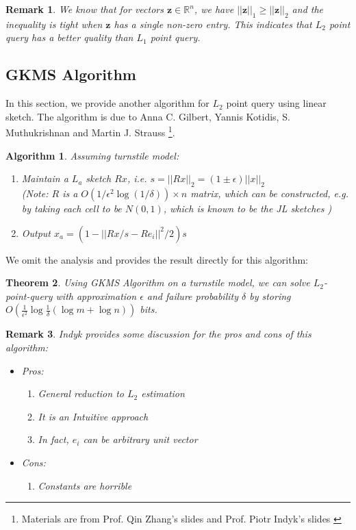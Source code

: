 \documentclass[11pt]{article}
\theoremstyle{plain}
\newtheorem{theorem}{Theorem}[section]
\newtheorem{algorithm}{Algorithm}[section]
\newtheorem{remark}[theorem]{Remark}
\begin{document}
\begin{remark}
We know that for vectors $\textbf{z}\in \mathbb{R}^n$, we have 
$||\textbf{z}||_1\geq||\textbf{z}||_2$ and the inequality is tight when 
$\textbf{z}$ has a single non-zero entry. This indicates that $L_2$ point query 
has a better quality than $L_1$ point query. 
\end{remark}

\subsection{GKMS Algorithm}
In this section, we provide another algorithm for $L_2$ point query using linear 
sketch. The algorithm is due to Anna C. Gilbert, Yannis Kotidis, S. Muthukrishnan 
and Martin J. Strauss \cite{Gilbert03}\footnote{Materials are from Prof. Qin 
Zhang's slides  \cite{zhang2017-slides} and Prof. Piotr Indyk's slides  
\cite{indyk07-web}}.

\begin{algorithm}
Assuming turnstile model:
\begin{enumerate}
\item Maintain a $L_a$ sketch $Rx$, i.e. $s=||Rx||_2=(1\pm\epsilon)||x||_2$\\
(Note: $R$ is a $O(1/\epsilon^2 \log(1/\delta))\times n$ matrix, which can be 
constructed, e.g. by taking each cell to be $N (0, 1)$, which is known to be the 
JL sketches )
\item Output $x_a=(1-||Rx/s-Re_i||^2/2)s$
\end{enumerate}
\end{algorithm}

We omit the analysis and provides the result directly for this algorithm:

\begin{theorem}
	Using GKMS Algorithm on a turnstile model, we can solve 
	$L_2$-point-query with approximation 
	$\epsilon$ and failure probability $\delta$ by storing 
	$O(\frac{1}{\epsilon^2}\log 
	\frac{1}{\delta}(\log m 
	+\log n))$ bits.
\end{theorem}

\begin{remark}
Indyk \cite{indyk07-web} provides some discussion for the pros and cons of 
this algorithm:
\begin{itemize}
	\item Pros: \begin{enumerate}
		\item General reduction to $L_2$ estimation
		\item It is an Intuitive approach
		\item In fact, $e_i$ can be arbitrary unit vector
	\end{enumerate}
\item Cons: \begin{enumerate}
	\item Constants are horrible
\end{enumerate}
\end{itemize}
\end{remark}
\end{document}
